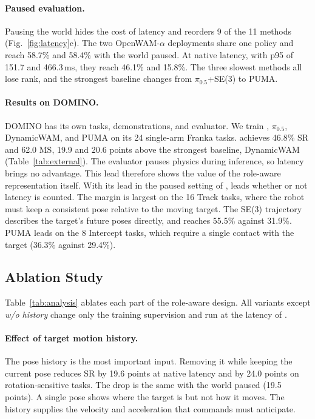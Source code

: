 \paragraph{Paused evaluation.}
Pausing the world hides the cost of latency and reorders 9 of the 11 methods
(Fig.~\ref{fig:latency}c). The two OpenWAM-$\alpha$ deployments share one policy and
reach 58.7\% and 58.4\% with the world paused. At native latency, with p95 of 151.7 and
466.3\,ms, they reach 46.1\% and 15.8\%. The three slowest methods all lose
rank, and the strongest baseline changes from $\pi_{0.5}$+SE(3) to PUMA.

\paragraph{Results on DOMINO.}
DOMINO \cite{domino} has its own tasks, demonstrations, and evaluator. We train \ours,
$\pi_{0.5}$, DynamicWAM, and PUMA on its 24 single-arm Franka tasks. \ours achieves
46.8\% SR and 62.0 MS, 19.9 and 20.6 points above the strongest baseline, DynamicWAM
(Table~\ref{tab:external}). The evaluator pauses physics during inference, so latency
brings no advantage. This lead therefore shows the value of the role-aware
representation itself. With its lead in the paused setting of \bench, \ours leads
whether or not latency is counted. The margin is largest on the 16
Track tasks, where the robot must keep a consistent pose relative to the moving target.
The SE(3) trajectory describes the target's future poses directly, and \ours reaches
55.5\% against 31.9\%. PUMA leads on the 8 Intercept tasks, which require a
single contact with the target (36.3\% against 29.4\%).

\subsection{Ablation Study}
\label{sec:principles}
Table~\ref{tab:analysis} ablates each part of the role-aware design. All
variants except \emph{w/o history} change only the training supervision and run at the
latency of \ours.



\paragraph{Effect of target motion history.}
The pose history is the most important input. Removing it while keeping the
current pose reduces SR by 19.6 points at native latency and by 24.0 points on
rotation-sensitive tasks. The drop is the same with the world paused (19.5 points). A
single pose shows where the target is but not how it moves. The history supplies the
velocity and acceleration that commands must anticipate.

